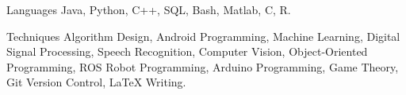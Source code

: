 

\begin{cvskills}
\cvskill
{Languages} %
{Java, Python,  C++,  SQL, Bash, Matlab, C, R.} %

\vspace{.1in}
\cvskill
{Techniques} %
{Algorithm Design, Android Programming, Machine Learning, Digital Signal Processing, Speech Recognition, Computer Vision, Object-Oriented Programming, ROS Robot Programming, Arduino Programming, Game Theory, Git Version Control, LaTeX Writing.} %



\end{cvskills}
